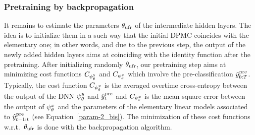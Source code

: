 




\subsubsection{Pretraining by backpropagation}
\label{sec:pretraining_backprop}
It remains to estimate 
the parameters $\theta_{\mathrm{ufr}}$ of the intermediate hidden
layers. The idea 
is to initialize them in a such way
that the initial DPMC coincides with
the elementary one; in other words, and
due to the previous step,
the output of the newly added hidden layers aims at coinciding with the 
identity function after the pretraining.
After initializing randomly $\theta_{\mathrm{ufr}}$,
our pretraining step aims at minimizing
cost functions $C_{\psi^{y}_{\theta}}$ and $C_{\psi^{x}_{\theta}}$ which involve the pre-classification $\hat{y}_{0:T}^{\mathrm{pre}}$. 
Typically, 
the cost function $C_{\psi^{y}_{\theta}}$ is the
averaged overtime cross-entropy
between the output of the DNN $\psi^{y}_{\theta}$
and $\hat{y}_{t}^{\mathrm{pre}}$ and $C_{\psi^{x}_{\theta}}$ is
the mean square error between the output
of $\psi^{x}_{\theta}$ and the parameters of the elementary
linear models associated to $\hat{y}_{t-1:t}^{\mathrm{pre}}$
(see Equation~\eqref{param-2_bis}). The minimization of
these cost functions w.r.t.~$\theta_{\rm ufr}$ is done with the backpropagation algorithm.
